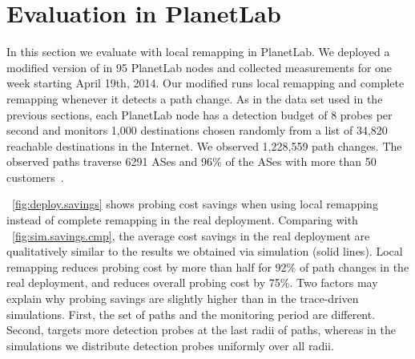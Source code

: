 \section{Evaluation in PlanetLab}
\label{sec:deploy}

In this section we evaluate \dtrack{} with local remapping in PlanetLab.
We deployed a modified version of \dtrack{} in 95 PlanetLab nodes and
collected measurements for one week starting April 19th, 2014.  Our
modified \dtrack{} runs local remapping and complete remapping whenever
it detects a path change.  As in the data set used in the previous
sections, each PlanetLab node has a detection budget of 8 probes per
second and monitors 1,000 destinations chosen randomly from a list of
34,820 reachable destinations in the Internet.  We observed 1,228,559
path changes.  The observed paths traverse 6291 ASes and 96\% of the
ASes with more than 50 customers~\cite{luckie13asrel}.

\figstr~\ref{fig:deploy.savings} shows probing cost savings when using
local remapping instead of complete remapping in the real deployment.
Comparing with \figstr~\ref{fig:sim.savings.cmp}, the average cost
savings in the real deployment are qualitatively similar to the results
we obtained via simulation (solid lines).  Local remapping reduces
probing cost by more than half for 92\% of path changes in the real
deployment, and reduces overall probing cost by 75\%.  Two factors may
explain why probing savings are slightly higher than in the trace-driven
simulations.  First, the set of paths and the monitoring period are
different.  Second,  \dtrack{} targets more detection probes at the last
radii of paths, whereas in the simulations we distribute detection
probes uniformly over all radii.


%
%


